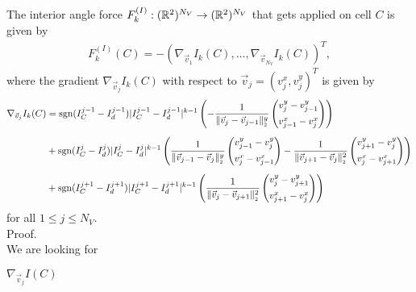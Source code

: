 \begin{proposition}
	The interior angle force $F_{k}^{(I)}: (\mathbb{R}^2)^{N_V} \rightarrow (\mathbb{R}^2)^{N_V}$ that gets applied on cell $C$ is given by  
	\begin{align*}
		F_{k}^{(I)}(C) 
		= - (\nabla_{\vec{v}_1} I_k(C), \ldots, \nabla_{\vec{v}_{N_V}} I_k(C))^T,
	\end{align*}
	where the gradient $\nabla_{\vec{v}_j} I_k(C)$ with respect to $\vec{v}_j = (v_{j}^{x}, v_{j}^{y})^T$ is given by 
	\begin{align}
		\begin{split}
			\nabla_{\vec{v}_j} I_k(C) &= \sgn(I^{j-1}_{C} - I^{j-1}_d) |I^{j-1}_{C} - I^{j-1}_d|^{k-1} \left( 
					- \frac{1}{\norm[\vec{v}_{j} - \vec{v}_{j-1}]^{y}} \begin{pmatrix}
						v_{j}^{y} - v_{j-1}^{y} \\[0.5em]
						v_{j-1}^{x} - v_{j}^{x}
					\end{pmatrix} 
				\right) \\[0.5em] 
			&+ \sgn(I^{j}_{C} - I^{j}_d)|I^{j}_{C} - I^{j}_d|^{k-1} \left( 
				\frac{1}{\norm[\vec{v}_{j-1} - \vec{v}_j]^{y}} \begin{pmatrix}
				v_{j-1}^{y} - v_{j}^{y} \\[0.5em]
				v_{j}^{x} - v_{j-1}^{x}
				\end{pmatrix} 
				- \frac{1}{\norm[\vec{v}_{j+1} - \vec{v}_j]^2} \begin{pmatrix}
				v_{j+1}^{y} - v_{j}^{y} \\[0.5em]
				v_{j}^{x} - v_{j+1}^{x}
				\end{pmatrix} 
				\right) \\[0.5em] 
			&+ \sgn(I^{j+1}_{C} - I^{j+1}_d) |I^{j+1}_{C} - I^{j+1}_d|^{k-1} \left( 
				\frac{1}{\norm[\vec{v}_{j} - \vec{v}_{j+1}]^2} \begin{pmatrix}
				v_{j}^{y} - v_{j+1}^{y} \\[0.5em]
				v_{j+1}^{x} - v_{j}^{x}
				\end{pmatrix} 
				\right) %
		\end{split}
		\label{gradient:angle}
	\end{align}
	for all $1 \leq j \leq N_V$.\\

	Proof. \\
	We are looking for 
	\begin{center}
		$
		\nabla_{\vec{v}_j} I(C)
		$
	\end{center}
	

\end{proposition}
